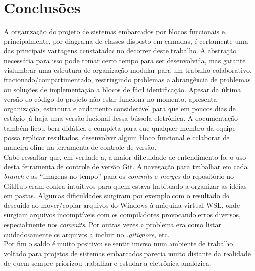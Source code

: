 \documentclass[10pt,twocolumn,letterpaper]{article}
\begin{document}
\section{Conclusões}
A organização do projeto de sistemas embarcados por blocos funcionais e, principalmente, por diagrama de 
classes disposto em camadas, é certamente uma das principais vantagens constatadas no decorrer deste trabalho. 
A abstração necessária para isso pode tomar certo tempo para ser desenvolvida, mas garante vislumbrar uma 
estrutura de organização modular para um trabalho colaborativo, fracionado/compartimentado, restringindo 
problemas a abrangência de problemas ou soluções de implementação a blocos de fácil identificação.
Apesar da última versão do código do projeto não estar funciona no momento, apresenta organização, estrutura 
e andamento considerável para que em poucos dias de estágio já haja uma versão fucional dessa bússola eletrônica.
A documentação também ficou bem didática e completa para que qualquer membro da equipe possa replicar 
resultados, desenvolver algum bloco funcional e colaborar de maneira oline na ferramenta de controle de versão.\\
Cabe ressaltar que, em verdade a, a maior dificuldade  de entendimento foi o uso desta ferramenta de 
controle de versão Git. A navegação para trabalhar em cada \emph{branch} e as ``imagens no tempo''
para os \emph{commits} e \emph{merges} do repositório no GitHub eram contra intuitivos para quem estava 
habituado a organizar as idéias em pastas. Algumas dificuldades surgiram por exemplo com o resultado do 
descuido ao mover/copiar arquivos do Windows à máquina virtual WSL, onde surgiam arquivos incomptíveis 
com os compiladores provocando erros diversos, especialmente nos \emph{commits}. Por outras vezes o problema 
era como listar cuidadosamente os arquivos a incluir no \emph{.gitignore}, etc.\\
Por fim o saldo é muito positivo: se sentir imerso num ambiente de trabalho voltado para projetos de sistemas
embarcados parecia muito distante da realidade de quem sempre priorizou trabalhar e estudar a eletrônica
analógica.
\end{document}
